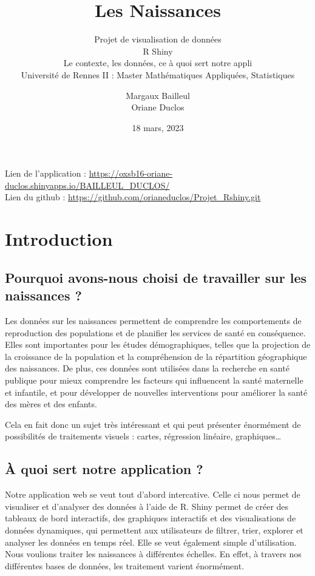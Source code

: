 \documentclass[
]{article}
\title{Les Naissances}
\subtitle{Projet de visualisation de données\\
R Shiny\\
Le contexte, les données, ce à quoi sert notre appli\\
Université de Rennes II : Master Mathématiques Appliquées, Statistiques}
\author{Margaux Bailleul\\
Oriane Duclos}
\date{18 mars, 2023}
\begin{document}
\maketitle

{
\setcounter{tocdepth}{2}
\tableofcontents
}
Lien de l'application :
\url{https://oxsb16-oriane-duclos.shinyapps.io/BAILLEUL_DUCLOS/}\\
Lien du github : \url{https://github.com/orianeduclos/Projet_Rshiny.git}

\hypertarget{introduction}{%
\section{Introduction}\label{introduction}}

\hypertarget{pourquoi-avons-nous-choisi-de-travailler-sur-les-naissances}{%
\subsection{Pourquoi avons-nous choisi de travailler sur les naissances
?}\label{pourquoi-avons-nous-choisi-de-travailler-sur-les-naissances}}

Les données sur les naissances permettent de comprendre les
comportements de reproduction des populations et de planifier les
services de santé en conséquence. Elles sont importantes pour les études
démographiques, telles que la projection de la croissance de la
population et la compréhension de la répartition géographique des
naissances. De plus, ces données sont utilisées dans la recherche en
santé publique pour mieux comprendre les facteurs qui influencent la
santé maternelle et infantile, et pour développer de nouvelles
interventions pour améliorer la santé des mères et des enfants.

Cela en fait donc un sujet très intéressant et qui peut présenter
énormément de possibilités de traitements visuels : cartes, régression
linéaire, graphiques\ldots{}

\hypertarget{uxe0-quoi-sert-notre-application}{%
\subsection{À quoi sert notre application
?}\label{uxe0-quoi-sert-notre-application}}

Notre application web se veut tout d'abord intercative. Celle ci nous
permet de visualiser et d'analyser des données à l'aide de R. Shiny
permet de créer des tableaux de bord interactifs, des graphiques
interactifs et des visualisations de données dynamiques, qui permettent
aux utilisateurs de filtrer, trier, explorer et analyser les données en
temps réel. Elle se veut également simple d'utilisation. Nous voulions
traiter les naissances à différentes échelles. En effet, à travers nos
différentes bases de données, les traitement varient énormément.
\end{document}
